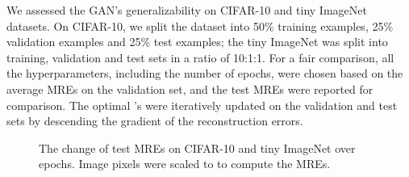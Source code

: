 \documentclass[11pt,fullpage, letterpaper,twoside]{article}
\newcommand{\1}[1]{\mathds{1}_{\left[#1\right]}}
\begin{document}
We assessed the GAN's generalizability on CIFAR-10 and tiny ImageNet datasets. On CIFAR-10, we split the dataset into 50\% training examples, 25\% validation examples and 25\% test examples; the tiny ImageNet was split into training, validation and test sets in a ratio of 10:1:1. For a fair comparison, all the hyperparameters, including the number of epochs, were chosen based on the average MREs on the validation set, and the test MREs were reported for comparison. The optimal 's were iteratively updated on the validation and test sets by descending the gradient of the reconstruction errors.




\begin{figure*}
\centering
{}
   \caption{The change of test MREs on CIFAR-10 and tiny ImageNet over epochs. Image pixels were scaled to  to compute the MREs. }\label{fig:cifar10_mre}
\end{figure*}
\end{document}

